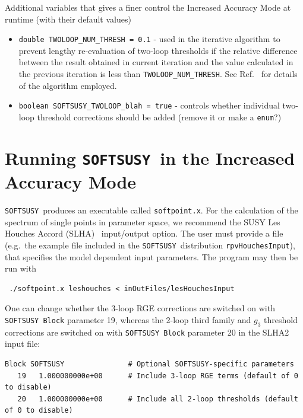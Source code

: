 \documentclass[final,3p,times,pdflatex]{elsarticle}
\def\SOFTSUSY{{\tt SOFTSUSY}}
\def\code#1{\small{\tt #1}\normalsize}
\begin{document}
Additional variables that gives a finer control the Increased Accuracy Mode at
runtime (with their default values) 
\begin{itemize}
	\item \verb|double TWOLOOP_NUM_THRESH = 0.1|  - 
          used in the iterative 
          algorithm to prevent lengthy re-evaluation of two-loop thresholds   
          if the relative difference between the result obtained in
          current iteration and the value calculated in the previous
          iteration is less than
          \verb|TWOLOOP_NUM_THRESH|. 
          See Ref.~\cite{Allanach:2001kg} for
          details of the 
          algorithm employed.
	\item \verb|boolean SOFTSUSY_TWOLOOP_blah = true| - 
          controls whether
          individual two-loop threshold corrections should be added (remove it
          or make a \verb|enum|?) 
\end{itemize}
        
        
\section{Running \SOFTSUSY~in the Increased Accuracy Mode}  
\label{sec:run}

\SOFTSUSY~produces an executable called \code{softpoint.x}. For the calculation
of the spectrum of single points in parameter space, we recommend the
SUSY Les Houches Accord (SLHA)~\cite{Skands:2003cj} input/output
option. The user must provide a file (e.g.\ the example file included
in the \SOFTSUSY~distribution
\code{rpvHouchesInput}), that specifies the model dependent input
parameters. The program may then be run with
\small
\begin{verbatim}
 ./softpoint.x leshouches < inOutFiles/lesHouchesInput
\end{verbatim}
\normalsize

One can change whether the 3-loop RGE corrections are switched on with
\code{SOFTSUSY Block} parameter 19, whereas the 2-loop third family and $g_3$
threshold corrections 
are switched on with \code{SOFTSUSY Block} parameter 20 in the SLHA2 input file:
\small
\begin{verbatim}
Block SOFTSUSY               # Optional SOFTSUSY-specific parameters
   19   1.000000000e+00      # Include 3-loop RGE terms (default of 0 to disable)
   20   1.000000000e+00      # Include all 2-loop thresholds (default of 0 to disable)
\end{verbatim}
\normalsize
\end{document}
